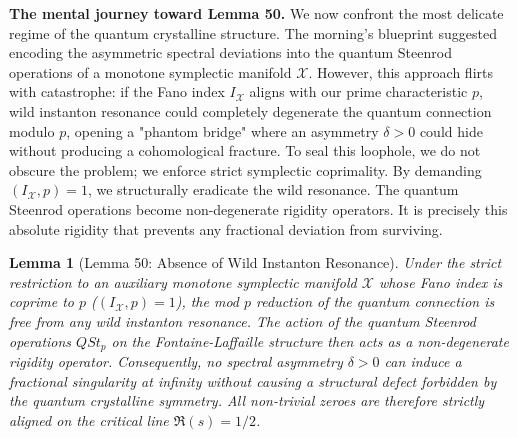 \documentclass[
]{article}
\newtheorem{lemma}{Lemma}
\begin{document}
\vspace{1em}
\noindent
\textbf{The mental journey toward Lemma 50.}
We now confront the most delicate regime of the quantum crystalline structure. The morning's blueprint suggested encoding the asymmetric spectral deviations into the quantum Steenrod operations of a monotone symplectic manifold $\mathcal{X}$. However, this approach flirts with catastrophe: if the Fano index $I_{\mathcal{X}}$ aligns with our prime characteristic $p$, wild instanton resonance could completely degenerate the quantum connection modulo $p$, opening a "phantom bridge" where an asymmetry $\delta > 0$ could hide without producing a cohomological fracture. To seal this loophole, we do not obscure the problem; we enforce strict symplectic coprimality. By demanding $(I_{\mathcal{X}}, p) = 1$, we structurally eradicate the wild resonance. The quantum Steenrod operations become non-degenerate rigidity operators. It is precisely this absolute rigidity that prevents any fractional deviation from surviving.

\begin{lemma}[Lemma 50: Absence of Wild Instanton Resonance]
Under the strict restriction to an auxiliary monotone symplectic manifold $\mathcal{X}$ whose Fano index is coprime to $p$ ($(I_{\mathcal{X}}, p) = 1$), the mod $p$ reduction of the quantum connection is free from any wild instanton resonance. The action of the quantum Steenrod operations $QSt_p$ on the Fontaine-Laffaille structure then acts as a non-degenerate rigidity operator. Consequently, no spectral asymmetry $\delta > 0$ can induce a fractional singularity at infinity without causing a structural defect forbidden by the quantum crystalline symmetry. All non-trivial zeroes are therefore strictly aligned on the critical line $\Re(s) = 1/2$.
\end{lemma}
\end{document}
